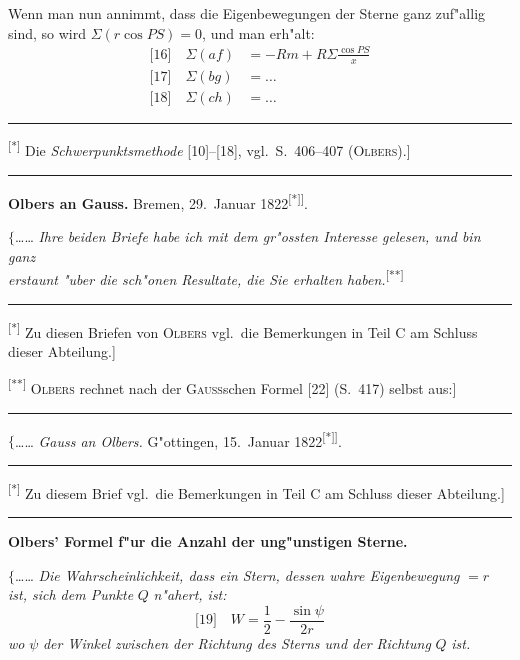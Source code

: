 \documentclass[12pt,a4paper]{article}
\theoremstyle{plain}
\theoremstyle{definition}
\theoremstyle{remark}
\begin{document}
Wenn man nun annimmt, dass die Eigenbewegungen der Sterne ganz zuf"allig sind, so wird $\Sigma(r\cos PS) = 0$, und man erh"alt:
\begin{align*}
\text{[16]}\quad \Sigma(af) &= -Rm + R\Sigma\frac{\cos PS}{x}\\
\text{[17]}\quad \Sigma(bg) &= \ldots\\
\text{[18]}\quad \Sigma(ch) &= \ldots
\end{align*}

\rule{\textwidth}{0.4pt}
{\small
\textsuperscript{[*]} Die {\itshape Schwerpunktsmethode} [10]--[18], vgl.\ S.\ 406--407 (\textsc{Olbers}).]
}
\rule{\textwidth}{0.4pt}

\vspace{1em}
\begin{center}
\textbf{Olbers an Gauss.} \quad Bremen, 29.\ Januar 1822\textsuperscript{[*]]}.
\end{center}

\noindent
$\{$\ldots{}\ldots{} {\itshape Ihre beiden Briefe habe ich mit dem gr"ossten Interesse gelesen, und bin ganz} \\ {\itshape erstaunt "uber die sch"onen Resultate, die Sie erhalten haben.}\textsuperscript{[**]}

\rule{\textwidth}{0.4pt}
{\small
\textsuperscript{[*]} Zu diesen Briefen von \textsc{Olbers} vgl.\ die Bemerkungen in Teil C am Schluss dieser Abteilung.]

\textsuperscript{[**]} \textsc{Olbers} rechnet nach der \textsc{Gauss}schen Formel [22] (S.\ 417) selbst aus:]
}
\rule{\textwidth}{0.4pt}

\noindent
$\{$\ldots{}\ldots{} {\itshape Gauss an Olbers.} \quad G"ottingen, 15.\ Januar 1822\textsuperscript{[*]]}.

\rule{\textwidth}{0.4pt}
{\small
\textsuperscript{[*]} Zu diesem Brief vgl.\ die Bemerkungen in Teil C am Schluss dieser Abteilung.]
}
\rule{\textwidth}{0.4pt}


\newpage
\begin{center}
\textbf{Olbers' Formel f"ur die Anzahl der \glq{}ung"unstigen\grq{} Sterne.}
\end{center}

\noindent
$\{$\ldots{}\ldots{} {\itshape Die Wahrscheinlichkeit, dass ein Stern, dessen wahre Eigenbewegung} $= r$ {\itshape ist, sich dem Punkte} $Q$ {\itshape n"ahert, ist:}
\[
\text{[19]}\quad W = \frac{1}{2} - \frac{\sin\psi}{2r}
\]
{\itshape wo} $\psi$ {\itshape der Winkel zwischen der Richtung des Sterns und der Richtung} $Q$ {\itshape ist.}
\end{document}
